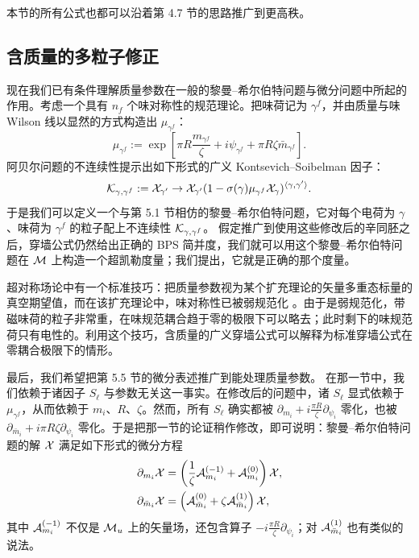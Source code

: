本节的所有公式也都可以沿着第 4.7 节的思路推广到更高秩。%

\subsection{含质量的多粒子修正}

现在我们已有条件理解质量参数在一般的黎曼--希尔伯特问题与微分问题中所起的作用。考虑一个具有 $n_f$ 个味对称性的规范理论。把味荷记为 $\gamma^f$，并由质量与味 Wilson 线以显然的方式构造出 $\mu_{\gamma^f}$：
\begin{equation}
\mu_{\gamma^f} := \exp \left[ \pi R \frac{m_{\gamma^f}}{\zeta} + i \psi_{\gamma^f} + \pi R
\zeta \bar{m}_{\gamma^f} \right].
\end{equation}
阿贝尔问题的不连续性提示出如下形式的广义 Kontsevich--Soibelman 因子：
\begin{equation}
\label{eq:KS-generalized-masses}
\mathcal{K}_{\gamma,\gamma^f} := \mathcal{X}_{\gamma'} \to \mathcal{X}_{\gamma'} (1-
\sigma(\gamma) \mu_{\gamma^f} \mathcal{X}_\gamma)^{\langle \gamma,\gamma'
\rangle}.
\end{equation}
于是我们可以定义一个与第 5.1 节相仿的黎曼--希尔伯特问题，它对每个电荷为 $\gamma$、味荷为 $\gamma^f$ 的粒子配上不连续性 $\mathcal{K}_{\gamma,\gamma^f}$。%
假定推广到使用这些修改后的辛同胚之后，穿墙公式仍然给出正确的 BPS 简并度，我们就可以用这个黎曼--希尔伯特问题在 $\mathcal{M}$ 上构造一个超凯勒度量；我们提出，它就是正确的那个度量。

超对称场论中有一个标准技巧：把质量参数视为某个扩充理论的矢量多重态标量的真空期望值，而在该扩充理论中，味对称性已被弱规范化 \cite{Seiberg:1993vc}。由于是弱规范化，带磁味荷的粒子非常重，在味规范耦合趋于零的极限下可以略去；此时剩下的味规范荷只有电性的。利用这个技巧，含质量的广义穿墙公式可以解释为标准穿墙公式在零耦合极限下的情形。

最后，我们希望把第 5.5 节的微分表述推广到能处理质量参数。%
在那一节中，我们依赖于诸因子 $S_\ell$ 与参数无关这一事实。在修改后的问题中，诸 $S_\ell$ 显式依赖于 $\mu_{\gamma^f}$，从而依赖于 $m_i$、$R$、$\zeta$。然而，所有 $S_\ell$ 确实都被 $\partial_{m_i} + i \frac{\pi R}{\zeta} \partial_{\psi_i}$ 零化，也被 $\partial_{\bar m_i} + i \pi R \zeta \partial_{\psi_i}$ 零化。于是把那一节的论证稍作修改，即可说明：黎曼--希尔伯特问题的解 $\mathcal{X}$ 满足如下形式的微分方程
\begin{align}
\partial_{m_i} \mathcal{X} &= \left(\frac{1}{\zeta} \mathcal{A}^{(-1)}_{m_i} + \mathcal{A}^{(0)}_{m_i} \right) \mathcal{X},
\label{eq:mass-equation} \\
\partial_{\bar{m}_i} \mathcal{X} &= \left(
\mathcal{A}^{(0)}_{\bar{m}_i} + \zeta \mathcal{A}^{(1)}_{\bar{m}_i} \right) \mathcal{X}, \label{eq:mass-bar-equation}
\end{align}
其中 $\mathcal{A}^{(-1)}_{m_i}$ 不仅是 $\mathcal{M}_u$ 上的矢量场，还包含算子 $-i \frac{\pi R}{\zeta} \partial_{\psi_i}$；对 $\mathcal{A}^{(1)}_{\bar{m}_i}$ 也有类似的说法。

